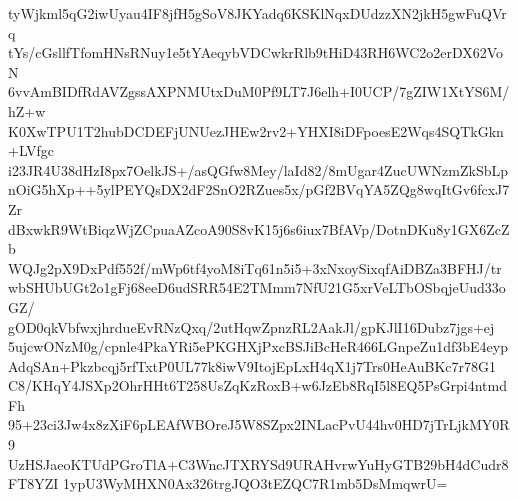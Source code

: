 tyWjkml5qG2iwUyau4IF8jfH5gSoV8JKYadq6KSKlNqxDUdzzXN2jkH5gwFuQVrq
tYs/cGsllfTfomHNsRNuy1e5tYAeqybVDCwkrRlb9tHiD43RH6WC2o2erDX62VoN
6vvAmBIDfRdAVZgssAXPNMUtxDuM0Pf9LT7J6elh+I0UCP/7gZIW1XtYS6M/hZ+w
K0XwTPU1T2hubDCDEFjUNUezJHEw2rv2+YHXI8iDFpoesE2Wqs4SQTkGkn+LVfgc
i23JR4U38dHzI8px7OelkJS+/asQGfw8Mey/laId82/8mUgar4ZucUWNzmZkSbLp
nOiG5hXp++5ylPEYQsDX2dF2SnO2RZues5x/pGf2BVqYA5ZQg8wqItGv6fcxJ7Zr
dBxwkR9WtBiqzWjZCpuaAZcoA90S8vK15j6s6iux7BfAVp/DotnDKu8y1GX6ZcZb
WQJg2pX9DxPdf552f/mWp6tf4yoM8iTq61n5i5+3xNxoySixqfAiDBZa3BFHJ/tr
wbSHUbUGt2o1gFj68eeD6udSRR54E2TMmm7NfU21G5xrVeLTbOSbqjeUud33oGZ/
gOD0qkVbfwxjhrdueEvRNzQxq/2utHqwZpnzRL2AakJl/gpKJlI16Dubz7jgs+ej
5ujcwONzM0g/cpnle4PkaYRi5ePKGHXjPxcBSJiBcHeR466LGnpeZu1df3bE4eyp
AdqSAn+Pkzbcqj5rfTxtP0UL77k8iwV9ItojEpLxH4qX1j7Trs0HeAuBKc7r78G1
C8/KHqY4JSXp2OhrHHt6T258UsZqKzRoxB+w6JzEb8RqI5l8EQ5PsGrpi4ntmdFh
95+23ci3Jw4x8zXiF6pLEAfWBOreJ5W8SZpx2INLacPvU44hv0HD7jTrLjkMY0R9
UzHSJaeoKTUdPGroTlA+C3WncJTXRYSd9URAHvrwYuHyGTB29bH4dCudr8FT8YZI
1ypU3WyMHXN0Ax326trgJQO3tEZQC7R1mb5DsMmqwrU=
